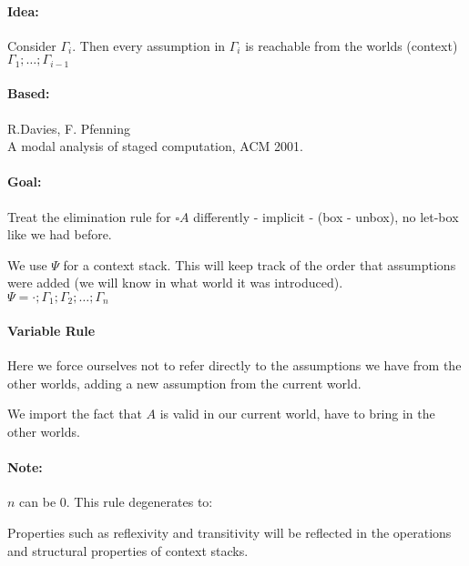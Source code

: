 \documentclass[12 pt]{article}
\begin{document}
      \paragraph{Idea:} Consider $\Gamma_i$. Then every assumption in
      $\Gamma_i$ is reachable from the worlds (context) $\Gamma_1;
      \ldots; \Gamma _{i - 1}$
      \paragraph{Based:} R.Davies, F. Pfenning
      \\ A modal analysis of staged computation, ACM 2001.
      \paragraph{Goal:} Treat the elimination rule for $\square A$
      differently - implicit - (box - unbox), no let-box like we had
      before.

      We use $\Psi$ for a context stack. This will keep track of the
      order that assumptions were added (we will know in what world it
      was introduced).
      \\ $\Psi = \cdot; \Gamma_1 ; \Gamma_2 ; \ldots ; \Gamma_n$
      \paragraph{Variable Rule}
      \begin{prooftree}
      \end{prooftree}
      \begin{prooftree}
      \end{prooftree}
      Here we force ourselves not to refer directly to the assumptions
      we have from the other worlds, adding a new assumption from the
      current world.
      \begin{prooftree}
      \end{prooftree}
      We import the fact that $A$ is valid in our current world, have
      to bring in the other worlds.
      \paragraph{Note:} $n$ can be $0$. This rule degenerates to:
      \begin{prooftree}
      \end{prooftree}
      Properties such as reflexivity and transitivity will be
      reflected in the operations and structural properties of context
      stacks.
\end{document}
